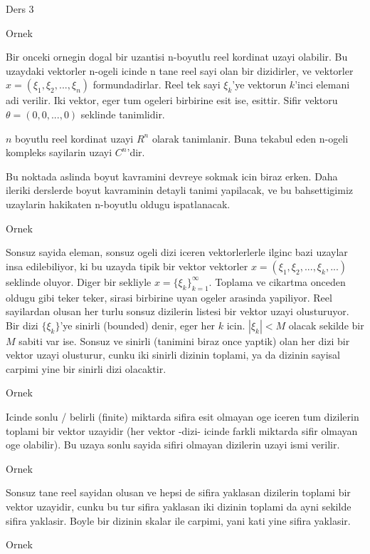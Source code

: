 \documentclass[12pt,fleqn]{article}
\begin{document}
Ders 3

Ornek 

Bir onceki ornegin dogal bir uzantisi n-boyutlu reel kordinat uzayi
olabilir. Bu uzaydaki vektorler n-ogeli icinde n tane reel sayi olan bir
dizidirler, ve vektorler $x = (\xi_1, \xi_2,...,\xi_n)$
formundadirlar. Reel tek sayi $\xi_k$'ye vektorun $k$'inci elemani adi
verilir. Iki vektor, eger tum ogeleri birbirine esit ise, esittir. Sifir
vektoru $\theta = (0,0,...,0)$ seklinde tanimlidir. 

$n$ boyutlu reel kordinat uzayi $R^n$ olarak tanimlanir. Buna tekabul eden
n-ogeli kompleks sayilarin uzayi $C^n$'dir. 

Bu noktada aslinda boyut kavramini devreye sokmak icin biraz erken. Daha
ileriki derslerde boyut kavraminin detayli tanimi yapilacak, ve bu
bahsettigimiz uzaylarin hakikaten n-boyutlu oldugu ispatlanacak. 

Ornek 

Sonsuz sayida eleman, sonsuz ogeli dizi iceren vektorlerlerle ilginc bazi
uzaylar insa edilebiliyor, ki bu uzayda tipik bir vektor vektorler 
$x =
(\xi_1, \xi_2,...,\xi_k,...)$ seklinde oluyor. Diger bir sekliyle $x =
\{\xi_k\} _{k=1}^{\infty}$. 
Toplama ve cikartma onceden oldugu gibi teker teker, sirasi birbirine uyan
ogeler arasinda yapiliyor. Reel sayilardan olusan her turlu sonsuz
dizilerin listesi bir vektor uzayi olusturuyor. Bir dizi $\{\xi_k\}$'ye
sinirli (bounded) denir, eger her $k$ icin.  $|\xi_k| < M$ olacak sekilde
bir $M$ sabiti var ise. Sonsuz ve sinirli (tanimini biraz once yaptik) olan 
her dizi bir vektor uzayi olusturur, cunku iki sinirli dizinin toplami, ya
da dizinin sayisal carpimi yine bir sinirli dizi olacaktir. 

Ornek 

Icinde sonlu / belirli (finite) miktarda sifira esit olmayan oge iceren tum
dizilerin toplami bir vektor uzayidir (her vektor -dizi- icinde farkli
miktarda sifir olmayan oge olabilir). Bu uzaya sonlu sayida sifiri olmayan
dizilerin uzayi ismi verilir. 

Ornek

Sonsuz tane reel sayidan olusan ve hepsi de sifira yaklasan dizilerin
toplami bir vektor uzayidir, cunku bu tur sifira yaklasan iki dizinin
toplami da ayni sekilde sifira yaklasir. Boyle bir dizinin skalar ile
carpimi, yani kati yine sifira yaklasir. 

Ornek 
\end{document}
